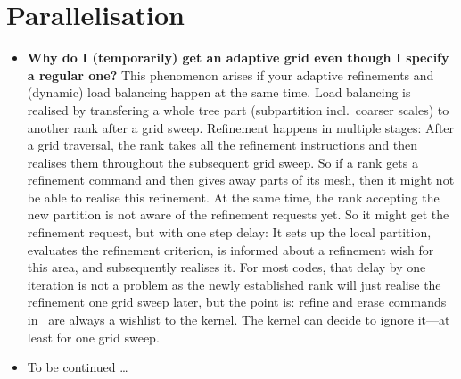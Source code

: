 \section{Parallelisation}

\begin{itemize}
  \item \textbf{Why do I (temporarily) get an adaptive grid even though I
  specify a regular one?}
  This phenomenon arises if your adaptive refinements and (dynamic) load
  balancing happen at the same time. Load balancing is realised by transfering a
  whole tree part (subpartition incl.~coarser scales) to another rank after a
  grid sweep. Refinement happens in multiple stages: After a grid traversal, the
  rank takes all the refinement instructions and then realises them throughout
  the subsequent grid sweep. So if a rank gets a refinement command and then
  gives away parts of its mesh, then it might not be able to realise this 
  refinement. At the same time, the rank accepting the new partition is not
  aware of the refinement requests yet. So it might get the refinement
  request, but with one step delay: It sets up the local partition, evaluates
  the refinement criterion, is informed about a refinement wish for this
  area, and subsequently realises it. For most codes, that delay by one
  iteration is not a problem as the newly established rank will just realise the
  refinement one grid sweep later, but the point is:
  refine and erase commands in \Peano\ are always a wishlist to the kernel. The
  kernel can decide to ignore it---at least for one grid sweep.
  \item To be continued \dots
\end{itemize}
